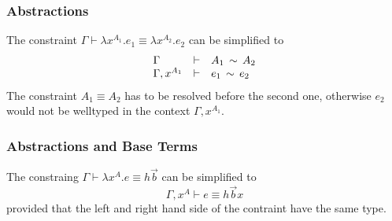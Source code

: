 \subsubsection{Abstractions}

The constraint $\Gamma \vdash \lambda x^{A_1}. e_1 \equiv \lambda x^{A_2}. e_2$
can be simplified to
$$
    \begin{array}{lllll} 
        \Gamma          & \vdash & A_1 \,\sim\, A_2
        \\
        \Gamma, x^{A_1} & \vdash & e_1 \,\sim\, e_2
     \end{array}
$$
%
The constraint $A_1 \equiv A_2$ has to be resolved before the second one,
otherwise $e_2$ would not be welltyped in the context $\Gamma, x^{A_1}$.




\subsubsection{Abstractions and Base Terms}

The constraing $\Gamma \vdash \lambda x^A.e \equiv h \vec b$ can be simplified
to
$$
    \Gamma, x^A \vdash e \equiv h \vec b x
$$
provided that the left and right hand side of the contraint have the same type.
